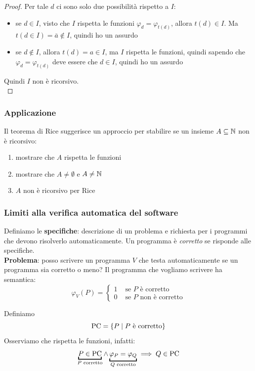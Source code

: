 \begin{proof}
	Per tale $d$ ci sono solo due possibilità rispetto a $I$:
	\begin{itemize}
		\item se $d \in I$, visto che $I$ rispetta le funzioni $\varphi_d = \varphi_{t(d)}$, allora $t(d) \in I$. Ma $t(d \in I) = \bar{a} \notin I$, quindi ho un assurdo
		\item se $d \notin I$, allora $t(d) = a \in I$, ma $I$ rispetta le funzioni, quindi sapendo che $\varphi_d = \varphi_{t(d)}$ deve essere che $d \in I$, quindi ho un assurdo
	\end{itemize}
	Quindi $I$ non è ricorsivo.\\
\end{proof}

\subsubsection{Applicazione}

Il teorema di Rice suggerisce un approccio per stabilire se un insieme $A \subseteq \mathbb{N}$ non è ricorsivo: 
\begin{enumerate}
	\item mostrare che $A$ rispetta le funzioni
	\item mostrare che $A \neq \emptyset$ e $A \neq \mathbb{N}$
	\item $A$ non è ricorsivo per Rice
\end{enumerate}

\subsubsection{Limiti alla verifica automatica del software}
Definiamo le \textbf{specifiche}: descrizione di un problema e richiesta per i programmi che devono risolverlo automaticamente. Un programma è \textit{corretto} se risponde alle specifiche.\\

\textbf{Problema}: posso scrivere un programma $V$ che testa automaticamente se un programma sia corretto o meno? Il programma che vogliamo scrivere ha semantica: 
$$
\varphi_V (P) = \begin{cases}
	1 & \text{ se } P \text{ è corretto} \\
	0 & \text{ se } P \text{ non è corretto}
\end{cases}
$$

Definiamo 
$$ \text{PC} = \left\{P \mid P \text{ è corretto}\right\}$$
Osserviamo che rispetta le funzioni, infatti: 
$$ \underbracket{P \in \pc}_{P \text{ corretto}} \wedge \underbracket{\varphi_P = \varphi_Q}_{Q \text{ corretto}} \implies Q \in \pc $$

